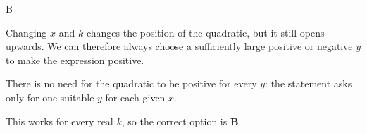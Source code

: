 \documentclass[11pt,a4paper]{article}
\begin{document}
\begin{enumerate}[label=\textbf{\arabic*.},leftmargin=*,itemsep=0pt,start=20]
\begin{djsSolution}{B}
\begin{djsSolutionFigure}
\end{djsSolutionFigure}

Changing $x$ and $k$ changes the position of the quadratic, but it still opens upwards. We can therefore always choose a sufficiently large positive or negative $y$ to make the expression positive.

There is no need for the quadratic to be positive for every $y$: the statement asks only for one suitable $y$ for each given $x$.

This works for every real $k$, so the correct option is \textbf{B}.
\end{djsSolution}
\end{enumerate}
\end{document}
